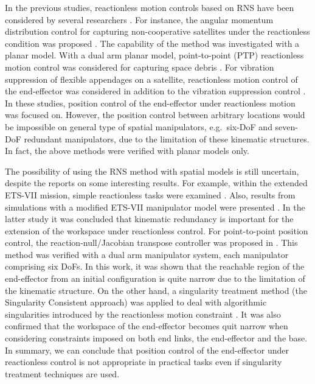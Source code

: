In the previous studies,
reactionless motion controls based on RNS have been considered by several researchers \cite{Hirano2014,Oki2007,Hara2010}.
For instance,
the angular momentum distribution control for capturing non-cooperative satellites
under the reactionless condition was proposed \cite{Dimitrov2004}.
The capability of the method was investigated with a planar model.
With a dual arm planar model,
point-to-point (PTP) reactionless motion control was considered for capturing space debris \cite{Shah2013}.
For vibration suppression of flexible appendages on a satellite,
reactionless motion control of the end-effector was considered
in addition to the vibration suppression control \cite{Hirano2014}.
In these studies,
position control of the end-effector under reactionless motion was focused on.
However, the position control between arbitrary locations
would be impossible on general type of spatial manipulators,
e.g.\ six-DoF and seven-DoF redundant manipulators,
due to the limitation of these kinematic structures.
In fact,
the above methods were verified with planar models only.

The possibility of using the RNS method with spatial models is still uncertain, despite 
the reports on some interesting results. For example, within the extended ETS-VII mission,
simple reactionless tasks were examined \cite{Yoshida2000,Yoshida2001}.
Also, results from simulations with a modified ETS-VII manipulator model 
were presented  \cite{Yoshida2001}. In the latter study it was concluded that kinematic redundancy is 
important for the extension of the workspace under reactionless control.
For point-to-point position control, the reaction-null/Jacobian transpose controller
was proposed in \cite{Pisculli2014}. This method was verified with a dual arm 
manipulator system, each manipulator comprising  six DoFs. 
In this work, it was shown that the reachable region of the end-effector from an initial
configuration is quite narrow due to the limitation of the kinematic structure.
On the other hand, a singularity treatment method (the Singularity Consistent approach) 
 was applied to deal with  algorithmic singularities introduced by the reactionless
motion constraint \cite{Nenchev1999c}. It was also confirmed that the workspace of the end-effector 
becomes quit narrow when considering constraints imposed on both end links, the end-effector and the base.
In summary, we can conclude that position control of the end-effector under reactionless control is 
not appropriate in practical tasks even if singularity treatment techniques are used.


